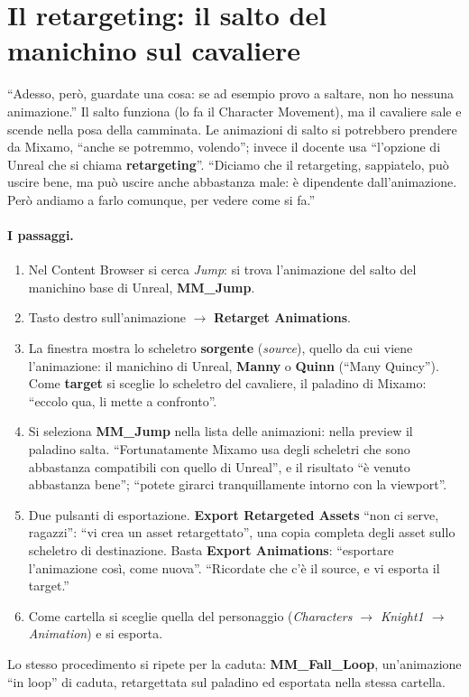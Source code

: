 \section{Il retargeting: il salto del manichino sul cavaliere}
\label{ue9:sec:retarget}

``Adesso, però, guardate una cosa: se ad esempio provo a saltare, non ho nessuna
animazione.'' Il salto funziona (lo fa il Character Movement), ma il cavaliere sale e
scende nella posa della camminata. Le animazioni di salto si potrebbero prendere da
Mixamo, ``anche se potremmo, volendo''; invece il docente usa ``l'opzione di Unreal che
si chiama \textbf{retargeting}''. ``Diciamo che il retargeting, sappiatelo, può uscire
bene, ma può uscire anche abbastanza male: è dipendente dall'animazione. Però andiamo a
farlo comunque, per vedere come si fa.''

\paragraph{I passaggi.}
\begin{enumerate}
  \item Nel Content Browser si cerca \emph{Jump}: si trova l'animazione del salto del
        manichino base di Unreal, \textbf{MM\_Jump}.
  \item Tasto destro sull'animazione $\rightarrow$ \textbf{Retarget Animations}.
  \item La finestra mostra lo scheletro \textbf{sorgente} (\emph{source}), quello da cui
        viene l'animazione: il manichino di Unreal, \textbf{Manny} o \textbf{Quinn}
        (``Many Quincy''). Come \textbf{target} si sceglie lo scheletro del cavaliere, il
        paladino di Mixamo: ``eccolo qua, li mette a confronto''.
  \item Si seleziona \textbf{MM\_Jump} nella lista delle animazioni: nella preview il
        paladino salta. ``Fortunatamente Mixamo usa degli scheletri che sono abbastanza
        compatibili con quello di Unreal'', e il risultato ``è venuto abbastanza bene'';
        ``potete girarci tranquillamente intorno con la viewport''.
  \item Due pulsanti di esportazione. \textbf{Export Retargeted Assets} ``non ci serve,
        ragazzi'': ``vi crea un asset retargettato'', una copia completa degli asset sullo
        scheletro di destinazione. Basta \textbf{Export Animations}: ``esportare
        l'animazione così, come nuova''. ``Ricordate che c'è il source, e vi esporta il
        target.''
  \item Come cartella si sceglie quella del personaggio (\emph{Characters $\rightarrow$
        Knight1 $\rightarrow$ Animation}) e si esporta.
\end{enumerate}
Lo stesso procedimento si ripete per la caduta: \textbf{MM\_Fall\_Loop}, un'animazione
``in loop'' di caduta, retargettata sul paladino ed esportata nella stessa cartella.

